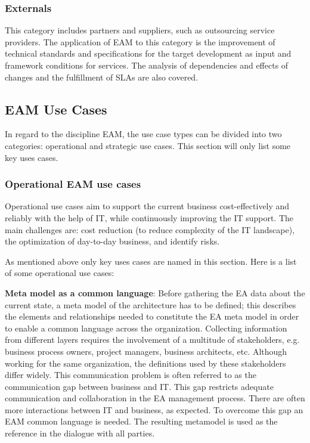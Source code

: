 \subsubsection{Externals}
This category includes partners and suppliers, such as outsourcing service providers. The application of EAM to this category is the improvement of technical standards and specifications for the target development as input and framework conditions for services. The analysis of dependencies and effects of changes and the fulfillment of SLAs are also covered. \cite{Hanschke2011}


\subsection{EAM Use Cases}


In regard to the discipline EAM, the use case types can be divided into two categories: operational and strategic use cases. This section will only list some key uses cases.

\subsubsection{Operational EAM use cases}
Operational use cases aim to support the current business cost-effectively and reliably with the help of IT, while continuously improving the IT support. The main challenges are: cost reduction (to reduce complexity of the IT landscape), the optimization of day-to-day business, and identify risks. \cite{Hanschke2011}

As mentioned above only key uses cases are named in this section. Here is a list of some operational use cases:

\textbf{Meta model as a common language}: Before gathering the EA data about the current state, a meta model of the architecture has to be defined; this describes the elements and relationships needed to constitute the EA meta model in order to enable a common language across the organization. Collecting information from different layers requires the involvement of a multitude of stakeholders, e.g. business process owners, project managers, business architects, etc. Although working for the same organization, the definitions used by these stakeholders differ widely. This communication problem is often referred to as the communication gap between business and IT. \cite{Schekkerman2004} This gap restricts adequate communication and collaboration in the EA management process. \cite{Buckl2009} There are often more interactions between IT and business, as expected. To overcome this gap an EAM common language is needed. The resulting metamodel is used as the reference in the dialogue with all parties. \cite{Hanschke2011}

